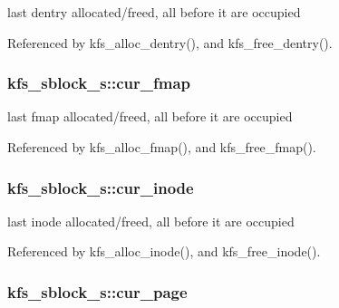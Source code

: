 last dentry allocated/freed, all before it are occupied 



Referenced by kfs\-\_\-alloc\-\_\-dentry(), and kfs\-\_\-free\-\_\-dentry().

\hypertarget{structkfs__sblock__s_acb1111b4f37733c412fb8eb4788c3c83}{
\subsubsection[{cur\-\_\-fmap}]{ kfs\-\_\-sblock\-\_\-s\-::cur\-\_\-fmap}}\label{structkfs__sblock__s_acb1111b4f37733c412fb8eb4788c3c83}


last fmap allocated/freed, all before it are occupied 



Referenced by kfs\-\_\-alloc\-\_\-fmap(), and kfs\-\_\-free\-\_\-fmap().

\hypertarget{structkfs__sblock__s_a299344e23b26aaf0f60f1f94a0faf966}{
\subsubsection[{cur\-\_\-inode}]{ kfs\-\_\-sblock\-\_\-s\-::cur\-\_\-inode}}\label{structkfs__sblock__s_a299344e23b26aaf0f60f1f94a0faf966}


last inode allocated/freed, all before it are occupied 



Referenced by kfs\-\_\-alloc\-\_\-inode(), and kfs\-\_\-free\-\_\-inode().

\hypertarget{structkfs__sblock__s_aa52c224196e86427970e3c4a0830190f}{
\subsubsection[{cur\-\_\-page}]{ kfs\-\_\-sblock\-\_\-s\-::cur\-\_\-page}}\label{structkfs__sblock__s_aa52c224196e86427970e3c4a0830190f}



